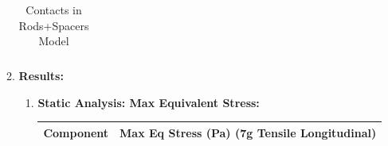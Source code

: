 \documentclass[../../main.tex]{subfiles}
\begin{document}
\begin{enumerate}
\begin{enumerate}
\begin{table}[H]
\begin{tabular}{|p{3cm}|p{5cm}|p{3cm}|}
                \end{tabular}
                \caption{Contacts in Rods+Spacers Model}
                \label{tab:my_label}
            \end{table}
            \item \textbf{Results: }
            \begin{enumerate}
            \item \textbf{Static Analysis: Max Equivalent Stress: }
                \begin{table}[H]
                    \centering
                    \begin{tabular}{|p{8cm}|p{6cm}|}
                         \hline
                         \textbf{Component} & \textbf{Max Eq Stress (Pa) \newline(7g Tensile Longitudinal)} \\
                         \hline
                         

\end{tabular}
\end{table}
\end{enumerate}
\end{enumerate}
\end{enumerate}
\end{document}
